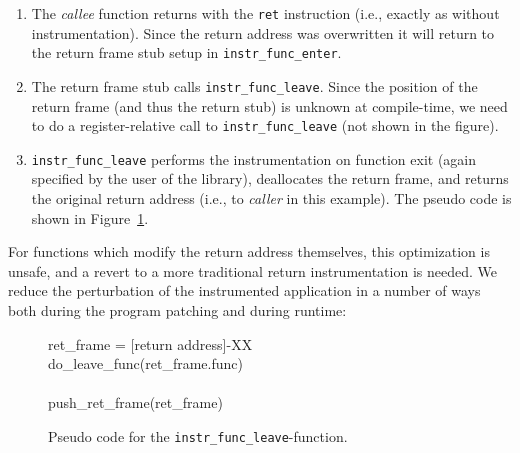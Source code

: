 \begin{enumerate}
\item The \emph{callee} function returns with the \texttt{ret} instruction
  (i.e., exactly as without instrumentation). Since the return address was
  overwritten it will return to the return frame stub setup in
  \texttt{instr\_func\_enter}.

\item The return frame stub calls \texttt{instr\_func\_leave}. Since the
  position of the return frame (and thus the return stub) is unknown at
  compile-time, we need to do a register-relative call to
  \texttt{instr\_func\_leave} (not shown in the figure).

\item \texttt{instr\_func\_leave} performs the instrumentation on function
  exit (again specified by the user of the library), deallocates the return
  frame, and returns the original return address (i.e., to \emph{caller} in
  this example). The pseudo code is shown in
  Figure~\ref{fig:lopi:instr_func_leave_code}.
\end{enumerate}

For functions which modify the return address themselves, this optimization is
unsafe, and a revert to a more traditional return instrumentation is needed.
We reduce the perturbation of the instrumented application in a number of ways
both during the program patching and during runtime:

\begin{figure}
  \begin{center}
    \begin{pseudocode}
        ret\_frame = [return address]-XX \\
        do\_leave\_func(ret\_frame.func) \\
        \\
        push\_ret\_frame(ret\_frame) \\
      \ENDFUNC
    \end{pseudocode}
  \end{center}
  \caption{Pseudo code for the \texttt{instr\_func\_leave}-function.}
  \label{fig:lopi:instr_func_leave_code}
\end{figure}

